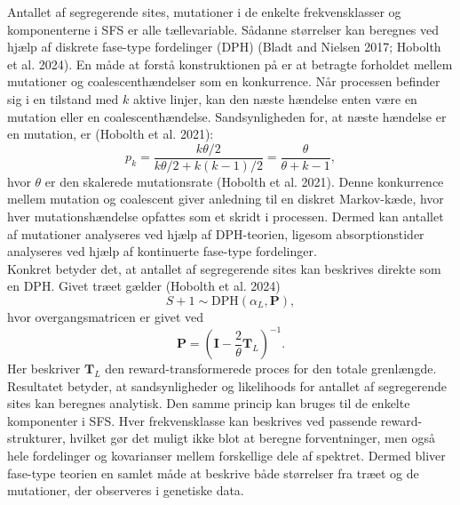 \documentclass[
  10pt,
  a4paper,
]{scrbook}
\begin{document}
Antallet af segregerende sites, mutationer i de enkelte frekvensklasser
og komponenterne i SFS er alle tællevariable. Sådanne størrelser kan
beregnes ved hjælp af diskrete fase-type fordelinger (DPH) (Bladt and
Nielsen 2017; Hobolth et al. 2024). En måde at forstå konstruktionen på
er at betragte forholdet mellem mutationer og coalescenthændelser som en
konkurrence. Når processen befinder sig i en tilstand med \(k\) aktive
linjer, kan den næste hændelse enten være en mutation eller en
coalescenthændelse. Sandsynligheden for, at næste hændelse er en
mutation, er (Hobolth et al. 2021): \[
p_k = \frac{k\theta/2}{k\theta/2 + k(k-1)/2} = \frac{\theta}{\theta + k-1},
\] hvor \(\theta\) er den skalerede mutationsrate (Hobolth et al. 2021).
Denne konkurrence mellem mutation og coalescent giver anledning til en
diskret Markov-kæde, hvor hver mutationshændelse opfattes som et skridt
i processen. Dermed kan antallet af mutationer analyseres ved hjælp af
DPH-teorien, ligesom absorptionstider analyseres ved hjælp af
kontinuerte fase-type fordelinger.\\
Konkret betyder det, at antallet af segregerende sites kan beskrives
direkte som en DPH. Givet træet gælder (Hobolth et al. 2024) \[
S+1 \sim \mathrm{DPH} (\alpha_L,\mathbf P),
\] hvor overgangsmatricen er givet ved \[
\mathbf{P} = \left(\mathbf{I} - \frac{2}{\theta}\mathbf{T}_L\right)^{-1}.
\] Her beskriver \(\mathbf{T}_L\) den reward-transformerede proces for
den totale grenlængde. Resultatet betyder, at sandsynligheder og
likelihoods for antallet af segregerende sites kan beregnes analytisk.
Den samme princip kan bruges til de enkelte komponenter i SFS. Hver
frekvensklasse kan beskrives ved passende reward-strukturer, hvilket gør
det muligt ikke blot at beregne forventninger, men også hele fordelinger
og kovarianser mellem forskellige dele af spektret. Dermed bliver
fase-type teorien en samlet måde at beskrive både størrelser fra træet
og de mutationer, der observeres i genetiske data.
\end{document}

